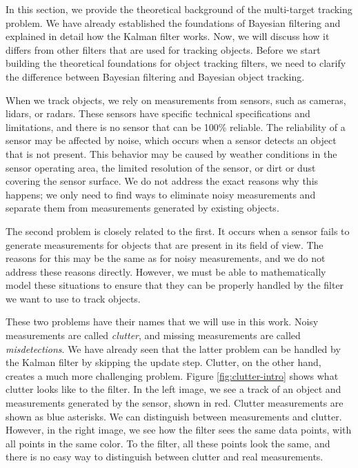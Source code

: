 
In this section, we provide the theoretical background of the multi-target tracking problem. We have already established the foundations of Bayesian filtering and explained in detail how the Kalman filter works. Now, we will discuss how it differs from other filters that are used for tracking objects. Before we start building the theoretical foundations for object tracking filters, we need to clarify the difference between Bayesian filtering and Bayesian object tracking.

When we track objects, we rely on measurements from sensors, such as cameras, lidars, or radars. These sensors have specific technical specifications and limitations, and there is no sensor that can be 100\% reliable. The reliability of a sensor may be affected by noise, which occurs when a sensor detects an object that is not present. This behavior may be caused by weather conditions in the sensor operating area, the limited resolution of the sensor, or dirt or dust covering the sensor surface. We do not address the exact reasons why this happens; we only need to find ways to eliminate noisy measurements and separate them from measurements generated by existing objects.

The second problem is closely related to the first. It occurs when a sensor fails to generate measurements for objects that are present in its field of view. The reasons for this may be the same as for noisy measurements, and we do not address these reasons directly. However, we must be able to mathematically model these situations to ensure that they can be properly handled by the filter we want to use to track objects.

These two problems have their names that we will use in this work. Noisy measurements are called \textit{clutter}, and missing measurements are called \textit{misdetections}. We have already seen that the latter problem can be handled by the Kalman filter by skipping the update step. Clutter, on the other hand, creates a much more challenging problem. Figure \ref{fig:clutter-intro} shows what clutter looks like to the filter. In the left image, we see a track of an object and measurements generated by the sensor, shown in red. Clutter measurements are shown as blue asterisks. We can distinguish between measurements and clutter. However, in the right image, we see how the filter sees the same data points, with all points in the same color. To the filter, all these points look the same, and there is no easy way to distinguish between clutter and real measurements.

